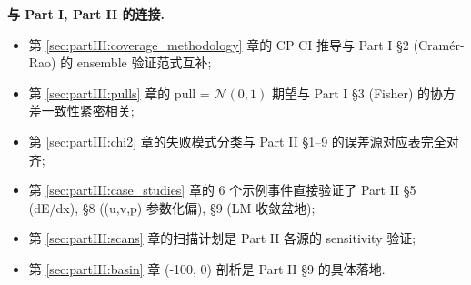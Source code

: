 \textbf{与 Part I, Part II 的连接.}
\begin{itemize}[nosep]
  \item 第 \ref{sec:partIII:coverage_methodology} 章的 CP CI 推导与 Part I §2 (Cramér-Rao) 的 ensemble 验证范式互补;
  \item 第 \ref{sec:partIII:pulls} 章的 pull = $\mathcal{N}(0, 1)$ 期望与 Part I §3 (Fisher) 的协方差一致性紧密相关;
  \item 第 \ref{sec:partIII:chi2} 章的失败模式分类与 Part II §1--9 的误差源对应表完全对齐;
  \item 第 \ref{sec:partIII:case_studies} 章的 6 个示例事件直接验证了 Part II §5 (dE/dx), §8 ((u,v,p) 参数化偏), §9 (LM 收敛盆地);
  \item 第 \ref{sec:partIII:scans} 章的扫描计划是 Part II 各源的 sensitivity 验证;
  \item 第 \ref{sec:partIII:basin} 章 (-100, 0) 剖析是 Part II §9 的具体落地.
\end{itemize}

